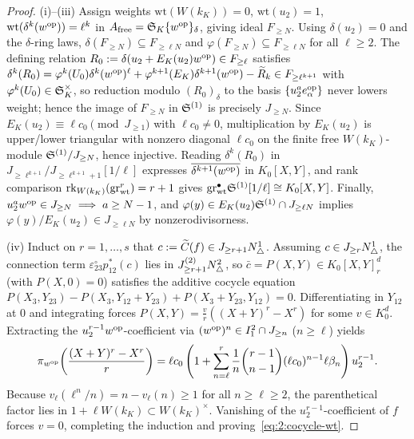 \begin{proof}
(i)--(iii) Assign weights $\mathrm{wt}(W(k_K)) = 0$, $\mathrm{wt}(u_2) = 1$, $\mathrm{wt}(\delta^k(w^{\mathrm{op}})) = \ell^k$ in $A_{\mathrm{free}} = \mathfrak{S}_K\{w^{\mathrm{op}}\}_\delta$, giving ideal $F_{\ge N}$. Using $\delta(u_2) = 0$ and the $\delta$-ring laws, $\delta(F_{\ge N}) \subseteq F_{\ge \ell N}$ and $\varphi(F_{\ge N}) \subseteq F_{\ge \ell N}$ for all $\ell \ge 2$. The defining relation $R_0 := \delta(u_2 + E_K(u_2)w^{\mathrm{op}}) \in F_{\ge \ell}$ satisfies $\delta^k(R_0) = \varphi^k(U_0)\delta^k(w^{\mathrm{op}})^\ell + \varphi^{k+1}(E_K)\delta^{k+1}(w^{\mathrm{op}}) - \widetilde{R}_k \in F_{\ge \ell^{k+1}}$ with $\varphi^k(U_0) \in \mathfrak{S}_K^\times$, so reduction modulo $(R_0)_\delta$ to the basis $\{u_2^a e_\alpha^{\mathrm{op}}\}$ never lowers weight; hence the image of $F_{\ge N}$ in $\mathfrak{S}^{(1)}$ is precisely $J_{\ge N}$. Since $E_K(u_2) \equiv \ell c_0 \pmod{J_{\ge 1}}$ with $\ell c_0 \neq 0$, multiplication by $E_K(u_2)$ is upper/lower triangular with nonzero diagonal $\ell c_0$ on the finite free $W(k_K)$-module $\mathfrak{S}^{(1)}/J_{\ge N}$, hence injective. Reading $\delta^k(R_0)$ in $J_{\ge \ell^{k+1}}/J_{\ge \ell^{k+1}+1}[1/\ell]$ expresses $\overline{\delta^{k+1}(w^{\mathrm{op}})}$ in $K_0[X,Y]$, and rank comparison $\operatorname{rk}_{W(k_K)}(\mathrm{gr}^r_{\mathrm{wt}}) = r+1$ gives $\mathrm{gr}^\bullet_{\mathrm{wt}}\mathfrak{S}^{(1)}[1/\ell] \cong K_0[X,Y]$. Finally, $u_2^a w^{\mathrm{op}} \in J_{\ge N} \implies a \ge N-1$, and $\varphi(y) \in E_K(u_2)\mathfrak{S}^{(1)} \cap J_{\ge \ell N}$ implies $\varphi(y)/E_K(u_2) \in J_{\ge \ell N}$ by nonzerodivisorness.

(iv) Induct on $r = 1, \dots, s$ that $c := \widetilde{C}(f) \in J_{\ge r+1} N^1_\triangle$. Assuming $c \in J_{\ge r} N^1_\triangle$, the connection term $\varepsilon_{23}^\circ p_{12}^*(c)$ lies in $J^{(2)}_{\ge r+1} N^2_\triangle$, so $\bar{c} = P(X,Y) \in K_0[X,Y]_r^d$ (with $P(X,0)=0$) satisfies the additive cocycle equation $P(X_3, Y_{23}) - P(X_3, Y_{12}+Y_{23}) + P(X_3+Y_{23}, Y_{12}) = 0$. Differentiating in $Y_{12}$ at $0$ and integrating forces $P(X,Y) = \frac{v}{r}((X+Y)^r - X^r)$ for some $v \in K_0^d$. Extracting the $u_2^{r-1}w^{\mathrm{op}}$-coefficient via $(w^{\mathrm{op}})^n \in I_1^2 \cap J_{\ge n}$ ($n \ge \ell$) yields
\[
  \pi_{w^{\mathrm{op}}}\!\left(\frac{(X+Y)^r - X^r}{r}\right) = \ell c_0 \left(1 + \sum_{n=\ell}^r \frac{1}{n}\binom{r-1}{n-1}(\ell c_0)^{n-1}\ell\beta_n\right) u_2^{r-1}.
\]
Because $v_\ell(\ell^n/n) = n - v_\ell(n) \ge 1$ for all $n \ge \ell \ge 2$, the parenthetical factor lies in $1 + \ell W(k_K) \subset W(k_K)^\times$. Vanishing of the $u_2^{r-1}$-coefficient of $f$ forces $v=0$, completing the induction and proving~\eqref{eq:2:cocycle-wt}.
\end{proof}

